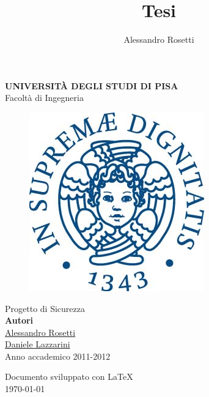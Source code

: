 \documentclass[a4paper,titlepage]{article}
\author{Alessandro Rosetti}
\title{Tesi}
\begin{document}
\begin{titlepage}
\begin{center}
\huge{\textbf{UNIVERSIT\`A DEGLI STUDI DI PISA}}\\
\LARGE{Facoltà di Ingegneria}
\begin{figure}[H]
  \centering \includegraphics[scale=0.35]{img/unipi.jpg}
\end{figure}
\vspace{2.5cm}
\Huge{Progetto di Sicurezza}\\[2.5cm]

\large{\textbf{Autori}}\\
\underline{\Large{Alessandro Rosetti}}\\
\underline{\Large{Daniele Lazzarini}}\\

\vfill
\large{Anno accademico 2011-2012}\\[2.0cm]
\end{center}
\end{titlepage}

\begin{center}
\thispagestyle{empty}
\newpage
\vfill
Documento sviluppato con \LaTeX\\
\today
\end{center}

\newpage

\tableofcontents \thispagestyle{fancy}
\newpage
\end{document}
